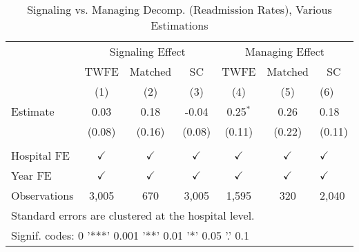\begin{table}[ht!]

\caption{\label{tab:signal_manage_read_estimators}Signaling vs. Managing Decomp. (Readmission Rates), Various Estimations}
\centering
\begin{tabular}[t]{lcccccl}
\toprule
\multicolumn{1}{c}{ } & \multicolumn{3}{c}{Signaling Effect} & \multicolumn{3}{c}{Managing Effect} \\
\cmidrule(l{3pt}r{3pt}){2-4} \cmidrule(l{3pt}r{3pt}){5-7}
\multicolumn{1}{c}{ } & \multicolumn{1}{c}{TWFE} & \multicolumn{1}{c}{Matched} & \multicolumn{1}{c}{SC} & \multicolumn{1}{c}{TWFE} & \multicolumn{1}{c}{Matched} & \multicolumn{1}{c}{SC} \\
\cmidrule(l{3pt}r{3pt}){2-2} \cmidrule(l{3pt}r{3pt}){3-3} \cmidrule(l{3pt}r{3pt}){4-4} \cmidrule(l{3pt}r{3pt}){5-5} \cmidrule(l{3pt}r{3pt}){6-6} \cmidrule(l{3pt}r{3pt}){7-7}
 & (1) & (2) & (3) & (4) & (5) & (6)\\
\midrule
Estimate & 0.03 & 0.18 & -0.04 & 0.25$^{*}$ & 0.26 & 0.18\\
 & (0.08) & (0.16) & (0.08) & (0.11) & (0.22) & (0.11)\\
 &  &  &  &  &  & \\
Hospital FE & $\checkmark$ & $\checkmark$ & $\checkmark$ & $\checkmark$ & $\checkmark$ & $\checkmark$\\
Year FE & $\checkmark$ & $\checkmark$ & $\checkmark$ & $\checkmark$ & $\checkmark$ & $\checkmark$\\
\addlinespace
Observations & 3,005 & 670 & 3,005 & 1,595 & 320 & 2,040\\
\bottomrule
\multicolumn{7}{l}{\textsuperscript{} Standard errors are clustered at the hospital level.}\\
\multicolumn{7}{l}{\textsuperscript{} Signif. codes: 0 '***' 0.001 '**' 0.01 '*' 0.05 '.' 0.1}\\
\end{tabular}
\end{table}
